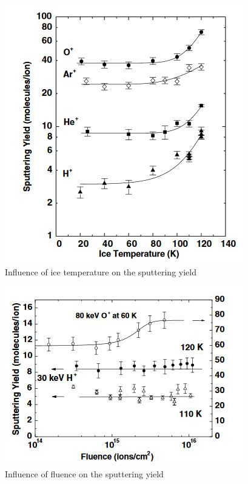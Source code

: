     \begin{figure}[H]		
\begin{center}
\includegraphics{Paul/sputtering30kev.JPG}
\end{center}
\caption{Influence of ice temperature on the sputtering yield}
\label{sputtering30kev}
\end{figure}

    \begin{figure}[H]		
\begin{center}
\includegraphics{Paul/sputteringfluence.JPG}
\end{center}
\caption{Influence of fluence on the sputtering yield}
\label{sputteringfluence}
\end{figure}

